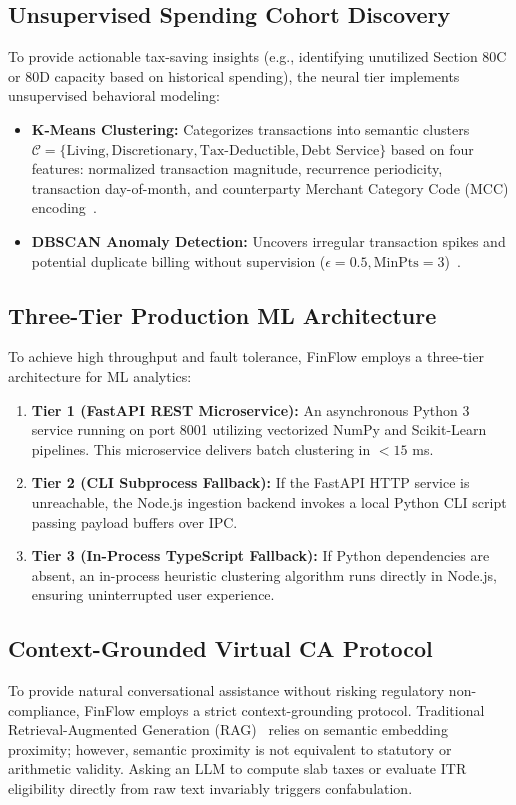 \documentclass[conference]{IEEEtran}
\begin{document}
\subsection{Unsupervised Spending Cohort Discovery}
To provide actionable tax-saving insights (e.g., identifying unutilized Section 80C or 80D capacity based on historical spending), the neural tier implements unsupervised behavioral modeling:
\begin{itemize}
    \item \textbf{K-Means Clustering:} Categorizes transactions into semantic clusters $\mathcal{C} = \{\text{Living}, \text{Discretionary}, \text{Tax-Deductible}, \text{Debt Service}\}$ based on four features: normalized transaction magnitude, recurrence periodicity, transaction day-of-month, and counterparty Merchant Category Code (MCC) encoding~\cite{macqueen1967kmeans}.
    \item \textbf{DBSCAN Anomaly Detection:} Uncovers irregular transaction spikes and potential duplicate billing without supervision ($\epsilon = 0.5, \text{MinPts} = 3$)~\cite{ester1996dbscan}.
\end{itemize}

\subsection{Three-Tier Production ML Architecture}
To achieve high throughput and fault tolerance, FinFlow employs a three-tier architecture for ML analytics:
\begin{enumerate}
    \item \textbf{Tier 1 (FastAPI REST Microservice):} An asynchronous Python 3 service running on port 8001 utilizing vectorized NumPy and Scikit-Learn pipelines. This microservice delivers batch clustering in $< 15$ ms.
    \item \textbf{Tier 2 (CLI Subprocess Fallback):} If the FastAPI HTTP service is unreachable, the Node.js ingestion backend invokes a local Python CLI script passing payload buffers over IPC.
    \item \textbf{Tier 3 (In-Process TypeScript Fallback):} If Python dependencies are absent, an in-process heuristic clustering algorithm runs directly in Node.js, ensuring uninterrupted user experience.
\end{enumerate}

\subsection{Context-Grounded Virtual CA Protocol}
To provide natural conversational assistance without risking regulatory non-compliance, FinFlow employs a strict context-grounding protocol. Traditional Retrieval-Augmented Generation (RAG)~\cite{lewis2020retrieval} relies on semantic embedding proximity; however, semantic proximity is not equivalent to statutory or arithmetic validity. Asking an LLM to compute slab taxes or evaluate ITR eligibility directly from raw text invariably triggers confabulation.
\end{document}
